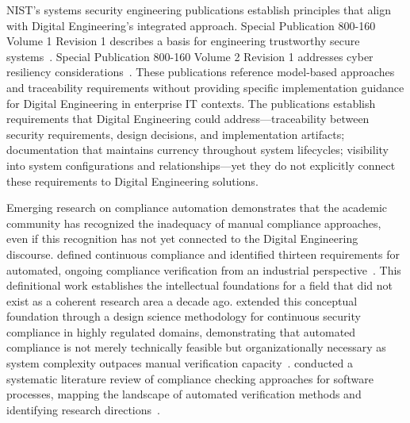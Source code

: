 NIST's systems security engineering publications establish principles that align with Digital Engineering's integrated approach. Special Publication 800-160 Volume 1 Revision 1 describes a basis for engineering trustworthy secure systems~\parencite{Ross_Winstead_McEvilley_2022}. Special Publication 800-160 Volume 2 Revision 1 addresses cyber resiliency considerations~\parencite{NIST_SP_800_160_V2_2021}. These publications reference model-based approaches and traceability requirements without providing specific implementation guidance for Digital Engineering in enterprise IT contexts. The publications establish requirements that Digital Engineering could address---traceability between security requirements, design decisions, and implementation artifacts; documentation that maintains currency throughout system lifecycles; visibility into system configurations and relationships---yet they do not explicitly connect these requirements to Digital Engineering solutions.

Emerging research on compliance automation demonstrates that the academic community has recognized the inadequacy of manual compliance approaches, even if this recognition has not yet connected to the Digital Engineering discourse. \citeauthor{Santilli_2023} defined continuous compliance and identified thirteen requirements for automated, ongoing compliance verification from an industrial perspective~\parencite{Santilli_2023}. This definitional work establishes the intellectual foundations for a field that did not exist as a coherent research area a decade ago. \citeauthor{Angermeir_2024} extended this conceptual foundation through a design science methodology for continuous security compliance in highly regulated domains, demonstrating that automated compliance is not merely technically feasible but organizationally necessary as system complexity outpaces manual verification capacity~\parencite{Angermeir_2024}. \citeauthor{Castellanos_Ardila_2022} conducted a systematic literature review of compliance checking approaches for software processes, mapping the landscape of automated verification methods and identifying research directions~\parencite{Castellanos_Ardila_2022}.

